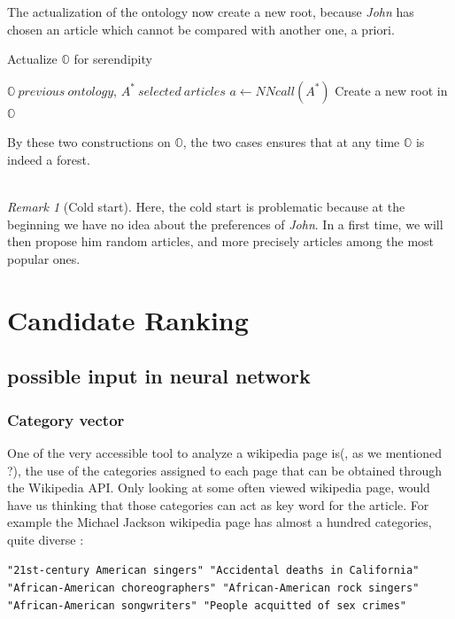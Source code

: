\documentclass[11pt]{article}
\theoremstyle{plain}
\theoremstyle{definition}
\theoremstyle{remark}
\newtheorem*{rem}{Remark}
\begin{document}
The actualization of the ontology now create a new root, because \textit{John} has chosen an article which cannot be compared with another one, a priori. 
\begin{algorithm}[h!]
	\caption{Actualize $\mathbb{O}$ for serendipity}
	\begin{algorithmic}
		\REQUIRE $\mathbb{O} \: previous \: ontology$, $A^* \: selected \: articles$
		\STATE $a\leftarrow NNcall(A^*)$
		\STATE Create a new root in $\mathbb{O}$
	\end{algorithmic}
\end{algorithm}

By these two constructions on $\mathbb{O}$, the two cases ensures that at any time $\mathbb{O}$ is indeed a forest. \\\\

\begin{rem}[Cold start]
Here, the cold start is problematic because at the beginning we have no idea about the preferences of \textit{John}. In a first time, we will then propose him random articles, and more precisely articles among the most popular ones. 
\end{rem}


\section{Candidate Ranking}

\subsection{possible input in neural network}

\subsubsection{Category vector}

One of the very accessible tool to analyze a wikipedia page is(, as we mentioned ?), the use of the categories assigned to each page that can be obtained through the Wikipedia API.
Only looking at some often viewed wikipedia page, would have us thinking that those categories can act as key word for the article. For example the Michael Jackson wikipedia page has almost a hundred categories, quite diverse :
 \begin{center}
	\texttt{"21st-century American singers" "Accidental deaths in California" "African-American choreographers" "African-American rock singers" "African-American songwriters"  "People acquitted of sex crimes"}
 \end{center}
\end{document}

